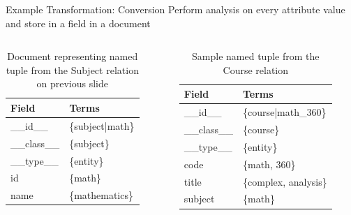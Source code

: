 \documentclass[compress]{beamer}
\begin{document}
		\begin{frame}{Example Transformation:  Conversion}
			Perform analysis on every attribute value and store in a field in a document
			
			\begin{columns}[T]
				\begin{column}{.5\textwidth}
					\begin{table}
						\centering
						
						\begin{tabular}{ll}
							\toprule
							Field & Terms \\
							\midrule
							\_\_id\_\_ & \{subject|math\} \\
							\_\_class\_\_ & \{subject\} \\
							\_\_type\_\_ & \{entity\} \\
							id & \{math\} \\
							name & \{mathematics\} \\
							\bottomrule
						\end{tabular}
						
						\caption{Document representing named tuple from the \alert{Subject} relation on previous slide}
					\end{table}
				\end{column}
				\hfill
				\begin{column}{.5\textwidth}
					\begin{table}
						\centering
						
						\begin{tabular}{ll}
							\toprule
							Field & Terms \\
							\midrule
							\_\_id\_\_ & \{course|math\_360\} \\
							\_\_class\_\_ & \{course\} \\
							\_\_type\_\_ & \{entity\} \\
							code & \{math, 360\} \\
							title & \{complex, analysis\} \\
							subject & \{math\} \\
							\bottomrule
						\end{tabular}
						
						\caption{Sample named tuple from the \alert{Course} relation}
					\end{table}
				\end{column}
			\end{columns}
		\end{frame}
		
\end{document}

